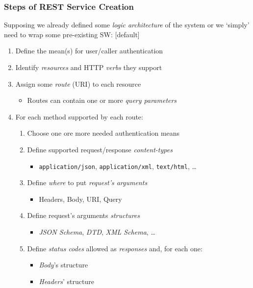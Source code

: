 \begin{frame}[allowframebreaks]
	\frametitle{Steps of REST Service Creation}
	
	Supposing we already defined some \emph{logic architecture} of the system or we `simply' need to wrap some pre-existing SW:
	[default]
	\begin{enumerate}
		\item Define the mean(s) for user/caller authentication
		\item Identify \emph{resources} and HTTP \emph{verbs} they support
		\item Assign some \emph{route} (URI) to each resource
		\begin{itemize}
			\item Routes can contain one or more \emph{query parameters}
		\end{itemize}
		
		\framebreak
		
		\item For each method supported by each route:
		\begin{enumerate}
			\item Choose one ore more needed authentication means
			\item Define supported request/response \emph{content-types}
			\begin{itemize}
				\item \texttt{application/json}, \texttt{application/xml}, \texttt{text/html}, \ldots			
			\end{itemize}
			\item Define \emph{where} to put \emph{request's arguments}
			\begin{itemize}
				\item Headers, Body, URI, Query	
			\end{itemize}
			\item Define request's arguments \emph{structures}
			\begin{itemize}
				\item \emph{JSON Schema}, \emph{DTD}, \emph{XML Schema}, \ldots
			\end{itemize}
			\item Define \emph{status codes} allowed as \emph{responses} and, for each one:
				\begin{itemize}
					\item \emph{Body}'s structure
					\item \emph{Headers}' structure
				\end{itemize}
		\end{enumerate}
	\end{enumerate}
	

\end{frame}

